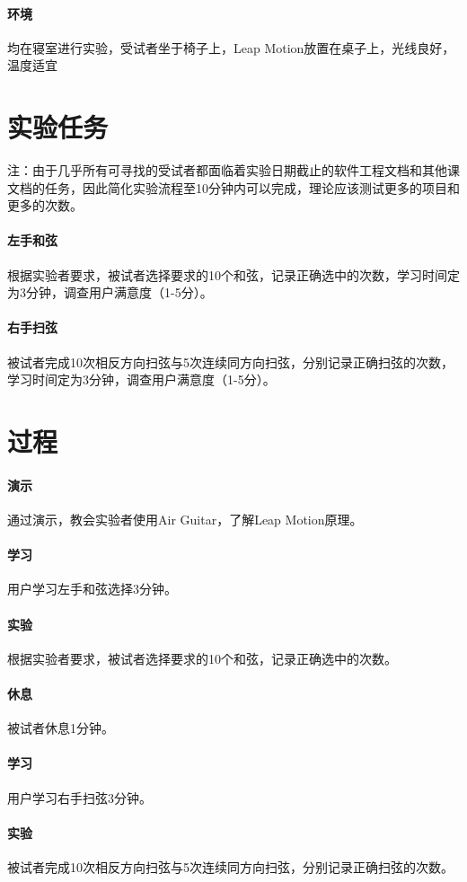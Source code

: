         \paragraph{环境} 均在寝室进行实验，受试者坐于椅子上，Leap Motion放置在桌子上，光线良好，温度适宜

    \section{实验任务}
        注：由于几乎所有可寻找的受试者都面临着实验日期截止的软件工程文档和其他课文档的任务，因此简化实验流程至10分钟内可以完成，理论应该测试更多的项目和更多的次数。
        \paragraph{左手和弦} 根据实验者要求，被试者选择要求的10个和弦，记录正确选中的次数，学习时间定为3分钟，调查用户满意度（1-5分）。
        \paragraph{右手扫弦} 被试者完成10次相反方向扫弦与5次连续同方向扫弦，分别记录正确扫弦的次数，学习时间定为3分钟，调查用户满意度（1-5分）。
    
    \section{过程}
        \paragraph{演示} 通过演示，教会实验者使用Air Guitar，了解Leap Motion原理。
        \paragraph{学习} 用户学习左手和弦选择3分钟。
        \paragraph{实验} 根据实验者要求，被试者选择要求的10个和弦，记录正确选中的次数。
        \paragraph{休息} 被试者休息1分钟。
        \paragraph{学习} 用户学习右手扫弦3分钟。
        \paragraph{实验} 被试者完成10次相反方向扫弦与5次连续同方向扫弦，分别记录正确扫弦的次数。


